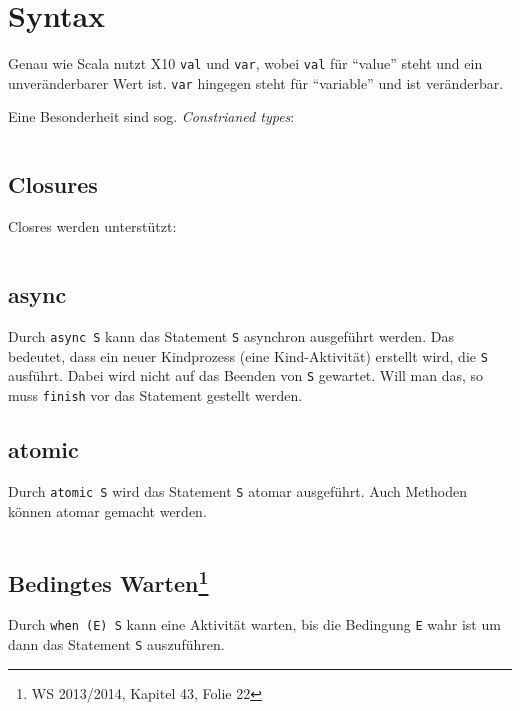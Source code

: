 \inputminted[numbersep=5pt, tabsize=4, frame=lines, label=HelloWorld.x10]{cpp}{scripts/x10/HelloWorld.x10}

\section{Syntax}
Genau wie Scala nutzt X10 \texttt{val} und \texttt{var}, wobei \texttt{val} für
\enquote{value} steht und ein unveränderbarer Wert ist. \texttt{var} hingegen
steht für \enquote{variable} und ist veränderbar.

Eine Besonderheit sind sog. \textit{Constrianed types}:

\inputminted[numbersep=5pt, tabsize=4]{scala}{scripts/x10/constrained-type-example.x10}

\subsection{Closures}%

Closres werden unterstützt:

\inputminted[numbersep=5pt, tabsize=4]{scala}{scripts/x10/closures-example.x10}

\subsection{async}%

Durch \texttt{async S} kann das Statement \texttt{S} asynchron ausgeführt werden.
Das bedeutet, dass ein neuer Kindprozess (eine Kind-Aktivität) erstellt wird, die
\texttt{S} ausführt. Dabei wird nicht auf das Beenden von \texttt{S} gewartet.
Will man das, so muss \texttt{finish} vor das Statement gestellt werden.

\subsection{atomic}%
Durch \texttt{atomic S} wird das Statement \texttt{S} atomar ausgeführt. Auch
Methoden können atomar gemacht werden.

\inputminted[numbersep=5pt, tabsize=4]{scala}{scripts/x10/atomic-example.x10}

\subsection[Bedingtes Warten]{Bedingtes Warten\footnote{WS 2013/2014, Kapitel 43, Folie 22}}%
Durch \texttt{when (E) S} kann eine Aktivität warten, bis die Bedingung \texttt{E}
wahr ist um dann das Statement \texttt{S} auszuführen.

